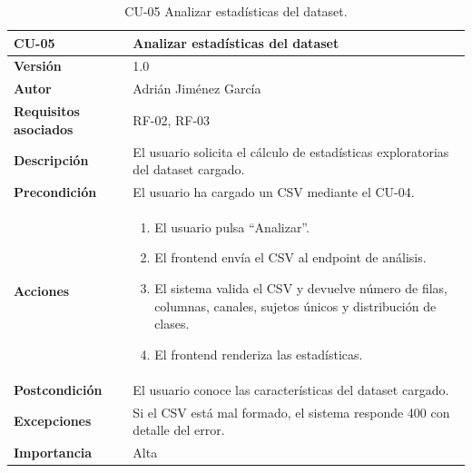 \begin{table}[p]
	\centering
	\begin{tabularx}{\linewidth}{ p{} X }
		\toprule
		\textbf{CU-05}    & \textbf{Analizar estadísticas del dataset}\\
		\toprule
		\textbf{Versión}              & 1.0 \\
		\textbf{Autor}                & Adrián Jiménez García \\
		\textbf{Requisitos asociados} & RF-02, RF-03 \\
		\textbf{Descripción}          & El usuario solicita el cálculo de estadísticas exploratorias del dataset cargado. \\
		\textbf{Precondición}         & El usuario ha cargado un CSV mediante el CU-04. \\
		\textbf{Acciones}             &
		\begin{enumerate}
			\def\labelenumi{\arabic{enumi}.}
			\tightlist
			\item El usuario pulsa ``Analizar''.
			\item El frontend envía el CSV al endpoint de análisis.
			\item El sistema valida el CSV y devuelve número de filas, columnas, canales, sujetos únicos y distribución de clases.
			\item El frontend renderiza las estadísticas.
		\end{enumerate}\\
		\textbf{Postcondición}        & El usuario conoce las características del dataset cargado. \\
		\textbf{Excepciones}          & Si el CSV está mal formado, el sistema responde 400 con detalle del error. \\
		\textbf{Importancia}          & Alta \\
		\bottomrule
	\end{tabularx}
	\caption{CU-05 Analizar estadísticas del dataset.}
\end{table}

